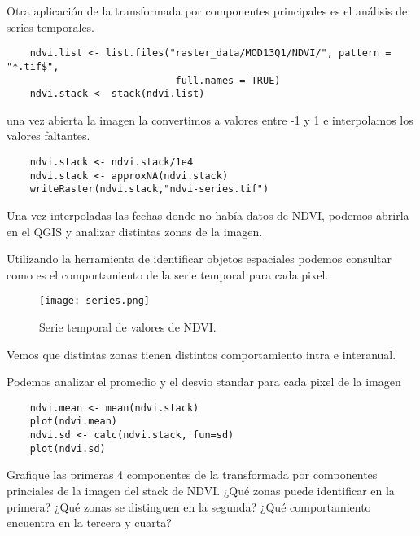 \begin{exa}
    Otra aplicaci\'on de la transformada por componentes principales
    es el an\'alisis de series temporales.
    \begin{lstlisting}
    ndvi.list <- list.files("raster_data/MOD13Q1/NDVI/", pattern = "*.tif$",
                             full.names = TRUE)
    ndvi.stack <- stack(ndvi.list)
    \end{lstlisting}
    una vez abierta la imagen la convertimos a valores entre -1 y 1 e
    interpolamos los valores faltantes.
    \begin{lstlisting}
    ndvi.stack <- ndvi.stack/1e4
    ndvi.stack <- approxNA(ndvi.stack)
    writeRaster(ndvi.stack,"ndvi-series.tif")
    \end{lstlisting}
    Una vez interpoladas las fechas donde no hab\'ia datos de NDVI, podemos
    abrirla en el QGIS y analizar distintas zonas de la imagen.

    Utilizando la herramienta de identificar objetos espaciales podemos
    consultar como es el comportamiento de la serie temporal para cada pixel.

    \begin{figure}[h!]
    \begin{center}
        \texttt{[image: series.png]}
    \end{center}
    \caption{Serie temporal de valores de NDVI.}
    \label{fig:series}
    \end{figure}

    Vemos que distintas zonas tienen distintos comportamiento intra e
    interanual.

    Podemos analizar el promedio y el desvio standar para cada pixel de la
    imagen
    \begin{lstlisting}
    ndvi.mean <- mean(ndvi.stack)
    plot(ndvi.mean)
    ndvi.sd <- calc(ndvi.stack, fun=sd)
    plot(ndvi.sd)
    \end{lstlisting}
\end{exa}

\begin{act}
    Grafique las primeras 4 componentes de la transformada por componentes
    princiales de la imagen del stack de NDVI\@. ¿Qu\'e zonas puede identificar en la
    primera? ¿Qu\'e zonas se distinguen en la segunda? ¿Qu\'e comportamiento encuentra
    en la tercera y cuarta?
\end{act}
